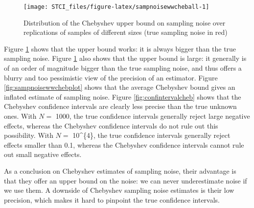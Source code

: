 \documentclass[]{book}
\theoremstyle{definition}
\theoremstyle{definition}
\theoremstyle{definition}
\theoremstyle{remark}
\begin{document}
\begin{figure}[htbp]

{\centering \texttt{[image: STCI\_files/figure-latex/sampnoisewwcheball-1]} 

}

\caption{Distribution of the Chebyshev upper bound on sampling noise over replications of samples of different sizes (true sampling noise in red)}\label{fig:sampnoisewwcheball}
\end{figure}

Figure \ref{fig:sampnoisewwcheball} shows that the upper bound works: it
is always bigger than the true sampling noise. Figure
\ref{fig:sampnoisewwcheball} also shows that the upper bound is large:
it generally is of an order of magnitude bigger than the true sampling
noise, and thus offers a blurry and too pessimistic view of the
precision of an estimator. Figure \ref{fig:sampnoisewwchebplot} shows
that the average Chebyshev bound gives an inflated estimate of sampling
noise. Figure \ref{fig:confintervalcheb} shows that the Chebyshev
confidence intervals are clearly less precise than the true unknown
ones. With \(N=\) 1000, the true confidence intervals generally reject
large negative effects, whereas the Chebyshev confidence intervals do
not rule out this possibility. With \(N=\) 10\^{}\{4\}, the true
confidence intervals generally reject effects smaller than 0.1, whereas
the Chebyshev confidence intervals cannot rule out small negative
effects.

As a conclusion on Chebyshev estimates of sampling noise, their
advantage is that they offer an upper bound on the noise: we can never
underestimate noise if we use them. A downside of Chebyshev sampling
noise estimates is their low precision, which makes it hard to pinpoint
the true confidence intervals.
\end{document}
